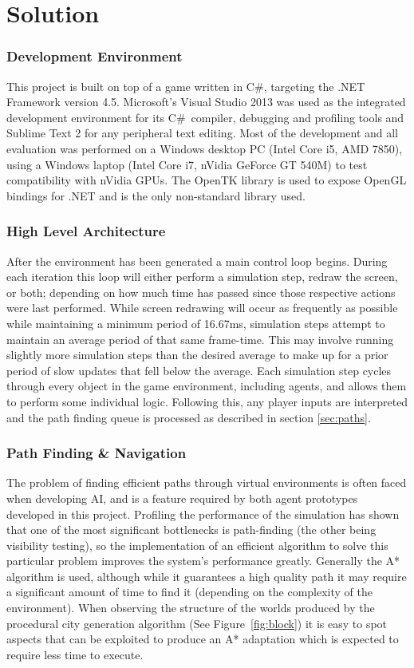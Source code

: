\documentclass[a4paper,12pt]{article}
\newcommand{\Csh}{C{\lserif\#}}
\begin{document}
\newpage
\section{Solution}
\subsubsection{Development Environment}\noindent
This project is built on top of a game written in \Csh, targeting the .NET Framework version 4.5. Microsoft's Visual Studio 2013 was used as the integrated development environment for its \Csh~compiler, debugging and profiling tools and Sublime Text 2 for any peripheral text editing. Most of the development and all evaluation was performed on a Windows desktop PC (Intel Core i5, AMD 7850), using a Windows laptop (Intel Core i7, nVidia GeForce GT 540M) to test compatibility with nVidia GPUs. The OpenTK library is used to expose OpenGL bindings for .NET and is the only non-standard library used.

\subsubsection{High Level Architecture}\noindent
After the environment has been generated a main control loop begins. During each iteration this loop will either perform a simulation step, redraw the screen, or both; depending on how much time has passed since those respective actions were last performed. While screen redrawing will occur as frequently as possible while maintaining a minimum period of 16.67ms, simulation steps attempt to maintain an average period of that same frame-time. This may involve running slightly more simulation steps than the desired average to make up for a prior period of slow updates that fell below the average. Each simulation step cycles through every object in the game environment, including agents, and allows them to perform some individual logic. Following this, any player inputs are interpreted and the path finding queue is processed as described in section \ref{sec:paths}.

\subsubsection{Path Finding \& Navigation}\noindent
The problem of finding efficient paths through virtual environments is often faced when developing AI, and is a feature required by both agent prototypes developed in this project. Profiling the performance of the simulation has shown that one of the most significant bottlenecks is path-finding (the other being visibility testing), so the implementation of an efficient algorithm to solve this particular problem improves the system's performance greatly. Generally the A* algorithm \cite{hart68} is used, although while it guarantees a high quality path it may require a significant amount of time to find it (depending on the complexity of the environment). When observing the structure of the worlds produced by the procedural city generation algorithm (See Figure~\ref{fig:block}) it is easy to spot aspects that can be exploited to produce an A* adaptation which is expected to require less time to execute.
\end{document}
